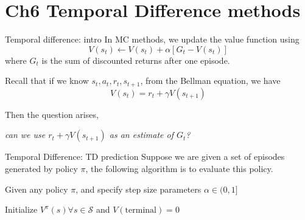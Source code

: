 \documentclass[handout]{beamer}
\begin{document}
\section{Ch6 Temporal Difference methods}
\begin{frame}{Temporal difference: intro}
In MC methods, we update the value function using 
$$
V(s_t) \leftarrow V(s_t) + \alpha \left[ G_t - V(s_t)\right]
$$
where $G_t$ is the sum of discounted returns after one episode. 

Recall that if we know $s_t, a_t, r_t, s_{t+1}$, from the Bellman equation, we have 
$$
V(s_t) = r_t + \gamma V(s_{t+1})
$$

Then the question arises,

\vspace{0.5cm}
\centering
\textit{can we use $r_t + \gamma V(s_{t+1})$ as an estimate of $G_t$?}

\vspace{0.2cm}

\color{red}{(luckily the answer is yes)}
\end{frame}

\begin{frame}{Temporal Difference: TD prediction}
\small
Suppose we are given a set of episodes generated by policy $\pi$, the following algorithm is to evaluate this policy.
\begin{algorithm}[H]
	\caption{Tabular TD(0) for estimating $V^{\pi}$}
	Given any policy $\pi$, and specify step size parameters $\alpha \in (0, 1]$
	
	Initialize $V^{\pi}(s) \forall s\in \mathcal{S}$ and $V(\text{terminal}) = 0$
	
\end{algorithm}
\end{frame}
\end{document}
